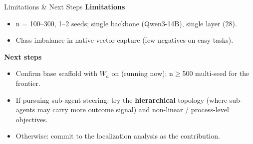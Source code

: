 \documentclass{beamer}
\begin{document}
\begin{frame}{Limitations \& Next Steps}
    \textbf{Limitations}
    \begin{itemize}
        \item n = 100--300, 1--2 seeds; single backbone (Qwen3-14B), single layer (28).
        \item Class imbalance in native-vector capture (few negatives on easy tasks).
    \end{itemize}
    \vspace{0.1cm}
    \textbf{Next steps}
    \begin{itemize}
        \item Confirm base scaffold with $W_a$ on (running now); n$\geq$500 multi-seed for the frontier.
        \item If pursuing sub-agent steering: try the \textbf{hierarchical} topology (where sub-agents may carry more outcome signal) and non-linear / process-level objectives.
        \item Otherwise: commit to the localization analysis as the contribution.
    \end{itemize}
\end{frame}
\end{document}
